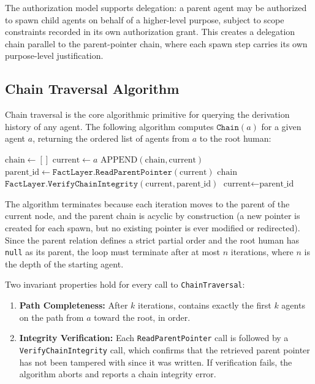 The authorization model supports delegation: a parent agent may be authorized
to spawn child agents on behalf of a higher-level purpose, subject to
scope constraints recorded in its own authorization grant. This creates
a delegation chain parallel to the parent-pointer chain, where each spawn
step carries its own purpose-level justification.

\subsection{Chain Traversal Algorithm}

Chain traversal is the core algorithmic primitive for querying the derivation
history of any agent. The following algorithm computes $\texttt{Chain}(a)$
for a given agent $a$, returning the ordered list of agents from $a$ to the
root human:

\begin{algorithm}
  \caption{Chain Traversal}
  \begin{algorithmic}[1]
      \State $\text{chain} \gets []$
      \State $\text{current} \gets a$
      \Loop
        \State $\text{APPEND}(\text{chain}, \text{current})$
        \State $\text{parent\_id} \gets \texttt{FactLayer.ReadParentPointer}(\text{current})$
          \State \Return $\text{chain}$
        \EndIf
        \State $\texttt{FactLayer.VerifyChainIntegrity}(\text{current}, \text{parent\_id})$
        \State $\text{current} \gets \text{parent\_id}$
      \EndLoop
    \EndFunction
  \end{algorithmic}
\end{algorithm}

The algorithm terminates because each iteration moves to the parent of the
current node, and the parent chain is acyclic by construction (a new
pointer is created for each spawn, but no existing pointer is ever modified
or redirected). Since the parent relation defines a strict partial order and
the root human has \texttt{null} as its parent, the loop must terminate
after at most $n$ iterations, where $n$ is the depth of the starting agent.

Two invariant properties hold for every call to \texttt{ChainTraversal}:

\begin{enumerate}
  \item \textbf{Path Completeness:} After $k$ iterations, 
        contains exactly the first $k$ agents on the path from $a$ toward
        the root, in order.
  \item \textbf{Integrity Verification:} Each \texttt{ReadParentPointer} call
        is followed by a \texttt{VerifyChainIntegrity} call, which confirms
        that the retrieved parent pointer has not been tampered with since
        it was written. If verification fails, the algorithm aborts and
        reports a chain integrity error.
\end{enumerate}

